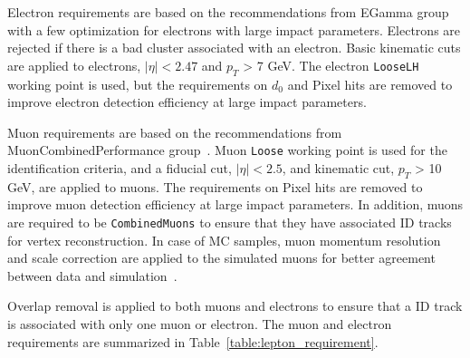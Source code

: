 Electron requirements are based on the recommendations from EGamma group~\cite{ElectronPhotonRun2} with a few optimization for electrons with large impact parameters. Electrons are rejected if there is a bad cluster associated with an electron. Basic kinematic cuts are applied to electrons, $|\eta| < 2.47$ and $p_{T}$ > 7 GeV. The electron \texttt{LooseLH} working point is used, but the requirements on $d_{0}$ and Pixel hits are removed to improve electron detection efficiency at large impact parameters.

Muon requirements are based on the recommendations from MuonCombinedPerformance group~\cite{MuonRun2}. Muon \texttt{Loose} working point is used for the identification criteria, and a fiducial cut, $|\eta| < 2.5$, and kinematic cut, $p_{T}$ > 10 GeV, are applied to muons. The requirements on Pixel hits are removed to improve muon detection efficiency at large impact parameters. In addition, muons are required to be \texttt{CombinedMuons} to ensure that they have associated ID tracks for vertex reconstruction. In case of MC samples, muon momentum resolution and scale correction are applied to the simulated muons for better agreement between data and simulation~\cite{Aad:2016jkr}. 

Overlap removal is applied to both muons and electrons to ensure that a ID track is associated with only one muon or electron.%
The muon and electron requirements are summarized in Table~\ref{table:lepton_requirement}.

